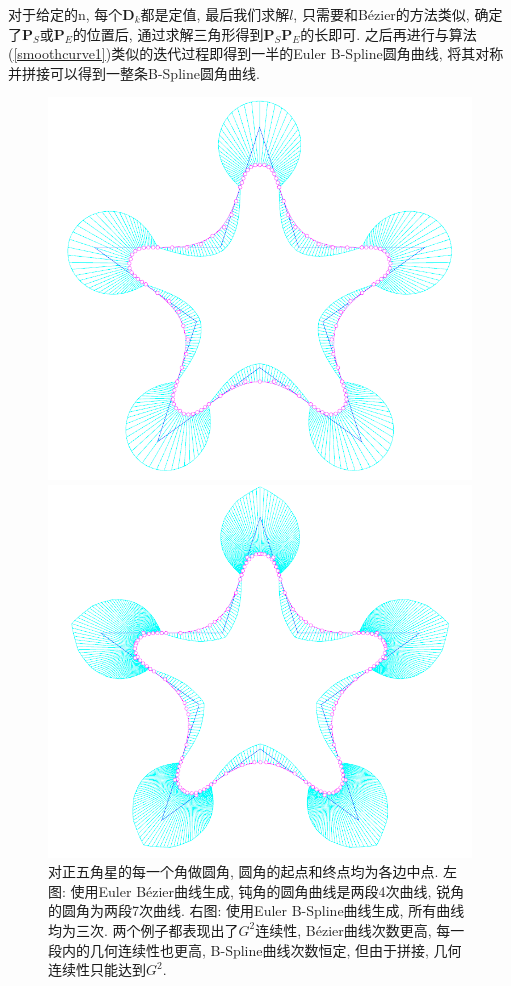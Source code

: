\documentclass[utf8]{ctexart} %
\begin{document}
	对于给定的n, 每个$\boldsymbol{D}_k$都是定值, 最后我们求解$l$, 只需要和B\'ezier的方法类似, 确定了$\boldsymbol{P}_S$或$\boldsymbol{P}_E$的位置后, 通过求解三角形得到$\boldsymbol{P}_S\boldsymbol{P}_E$的长即可. 之后再进行与算法(\ref{smoothcurve1})类似的迭代过程即得到一半的Euler B-Spline圆角曲线, 将其对称并拼接可以得到一整条B-Spline圆角曲线.
	\begin{figure}[htbp]\label{pentagram}
		\centering
		\begin{minipage}{0.49\linewidth}
			\centering
			\includegraphics[width=0.9\linewidth]{figures/SmoothingCorner3.png}
		\end{minipage}
		\begin{minipage}{0.49\linewidth}
			\centering
			\includegraphics[width=0.9\linewidth]{figures/SmoothingCorner4.png}
		\end{minipage}
		\caption{\small{对正五角星的每一个角做圆角, 圆角的起点和终点均为各边中点. 左图: 使用Euler B\'ezier曲线生成, 钝角的圆角曲线是两段4次曲线, 锐角的圆角为两段7次曲线. 右图: 使用Euler B-Spline曲线生成, 所有曲线均为三次. 两个例子都表现出了$G^2$连续性, B\'ezier曲线次数更高, 每一段内的几何连续性也更高, B-Spline曲线次数恒定, 但由于拼接, 几何连续性只能达到$G^2$.}}
	\end{figure}
\end{document}
